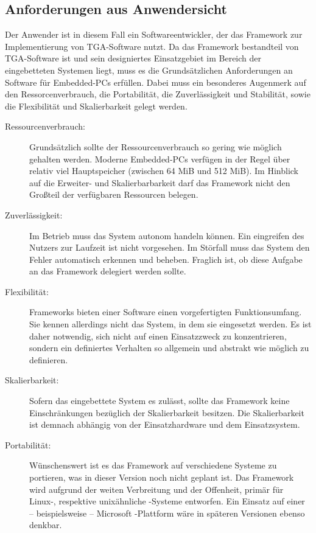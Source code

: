 \documentclass{hswpaper}
\begin{document}
\subsection{Anforderungen aus Anwendersicht}
Der Anwender ist in diesem Fall ein Softwareentwickler, der das Framework zur Implementierung von TGA-Software nutzt. Da das Framework bestandteil von TGA-Software ist und sein designiertes Einsatzgebiet im Bereich der eingebetteten Systemen liegt, muss es die Grundsätzlichen Anforderungen an Software für Embedded-PCs erfüllen. Dabei muss ein besonderes Augenmerk auf den Ressorcenverbrauch, die Portabilität, die Zuverlässigkeit und Stabilität, sowie die Flexibilität und Skalierbarkeit gelegt werden. \begin{description}
    \item[Ressourcenverbrauch:] Grundsätzlich sollte der Ressourcenverbrauch so gering wie möglich gehalten werden. Moderne Embedded-PCs verfügen in der Regel über relativ viel Hauptspeicher (zwischen 64 MiB und 512 MiB). Im Hinblick auf die Erweiter- und Skalierbarbarkeit darf das Framework nicht den Großteil der verfügbaren Ressourcen belegen.
    \item[Zuverlässigkeit:] Im Betrieb muss das System autonom handeln können. Ein eingreifen des Nutzers zur Laufzeit ist nicht vorgesehen. Im Störfall muss das System den Fehler automatisch erkennen und beheben. Fraglich ist, ob diese Aufgabe an das Framework delegiert werden sollte.
    \item[Flexibilität:] Frameworks bieten einer Software einen vorgefertigten Funktionsumfang. Sie kennen allerdings nicht das System, in dem sie eingesetzt werden. Es ist daher notwendig, sich nicht auf einen Einsatzzweck zu konzentrieren, sondern ein definiertes Verhalten so allgemein und abstrakt wie möglich zu definieren.
    \item[Skalierbarkeit:] Sofern das eingebettete System es zulässt, sollte das Framework keine Einschränkungen bezüglich der Skalierbarkeit besitzen. Die Skalierbarkeit ist demnach abhängig von der Einsatzhardware und dem Einsatzsystem.
    \item[Portabilität:] Wünschenswert ist es das Framework auf verschiedene Systeme zu portieren, was in dieser Version noch nicht geplant ist. Das Framework wird aufgrund der weiten Verbreitung und der Offenheit, primär für Linux-, respektive unixähnliche -Systeme entworfen. Ein Einsatz auf einer – beispielsweise – Microsoft -Plattform wäre in späteren Versionen ebenso denkbar.
\end{description}\par 
\end{document}
